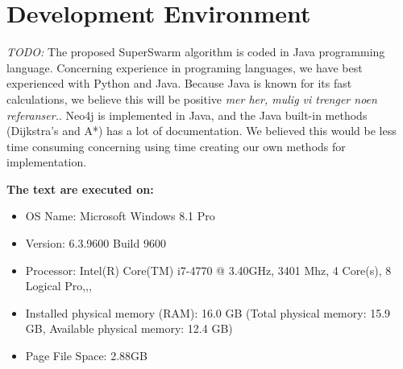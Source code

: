 \section{Development Environment}


\emph{\color{red}TODO:} The proposed SuperSwarm algorithm is coded in Java programming language.  Concerning experience in programing languages, we have best experienced with Python and Java. Because Java is known for its fast calculations, we believe this will be positive \emph{\color{red} mer her, mulig vi trenger noen referanser.}. Neo4j is implemented in Java, and the Java built-in methods (Dijkstra's and A*) has a lot of documentation. We believed this would be less time consuming  concerning using time creating our own methods for implementation. 



\textbf{The text are executed on: }

\begin{itemize}
\item OS Name: Microsoft Windows 8.1 Pro
\item Version: 6.3.9600 Build 9600
\item Processor: Intel(R) Core(TM) i7-4770 @ 3.40GHz, 3401 Mhz, 4 Core(s), 8 Logical Pro,,,
\item Installed physical memory (RAM): 16.0 GB (Total physical memory: 15.9 GB, Available physical memory: 12.4 GB)
\item Page File Space: 2.88GB
\end{itemize}